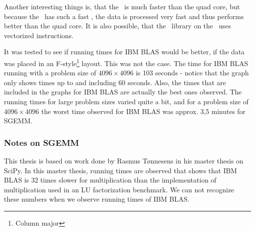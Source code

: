 Another interesting things is, that the \PPE\ is much faster than the
quad core, but because the \CBE\ has such a fast \EIB{}, the data is
processed very fast and thus performs better than the quad core. It is
also possible, that the \ATLAS\ library on the \PPE\ uses vectorized
instructions.

It was tested to see if running times for IBM BLAS would be better, if
the data was placed in an F-style\footnote{Column major} layout. This
was not the case. The time for IBM BLAS running with a problem size of
$4096 \times 4096$ is 103 seconds - notice that the graph only shows
times up to and including 60 seconds. Also, the times that are
included in the graphs for IBM BLAS are actually the best ones
observed. The running times for large problem sizes varied quite a
bit, and for a problem size of $4096 \times 4096$ the worst time
observed for IBM BLAS was approx. 3,5 minutes for SGEMM.


\subsubsection{Notes on SGEMM}

This thesis is based on work done by Rasmus T{\o}nnesens in his master
thesis on SciPy\cite{scipy}. In this master thesis, running times are
observed that shows that IBM BLAS is 32 times slower for
multiplication than the implementation of multiplication used in an LU
factorization benchmark. We can not recognize these numbers when we
observe running times of IBM BLAS.

